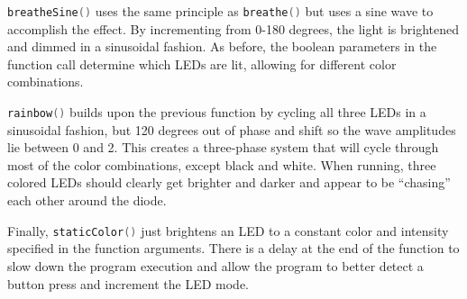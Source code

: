 \documentclass{article}
\begin{document}
    \lstinline[language=C++, style=mystyle]{breatheSine()} uses the same principle as \lstinline[language=C++, style=mystyle]{breathe()} but uses a sine wave to accomplish the effect.
    By incrementing from 0-180 degrees, the light is brightened and dimmed in a sinusoidal fashion.
    As before, the boolean parameters in the function call determine which LEDs are lit, allowing for different color combinations.

    \lstinline[language=C++, style=mystyle]{rainbow()} builds upon the previous function by cycling all three LEDs in a sinusoidal fashion, but 120 degrees out of phase and shift so the wave amplitudes lie between 0 and 2.
    This creates a three-phase system that will cycle through most of the color combinations, except black and white.
    When running, three colored LEDs should clearly get brighter and darker and appear to be ``chasing'' each other around the diode.

    Finally, \lstinline[language=C++, style=mystyle]{staticColor()} just brightens an LED to a constant color and intensity specified in the function arguments.
    There is a delay at the end of the function to slow down the program execution and allow the program to better detect a button press and increment the LED mode.

    \pagebreak
    
\end{document}
